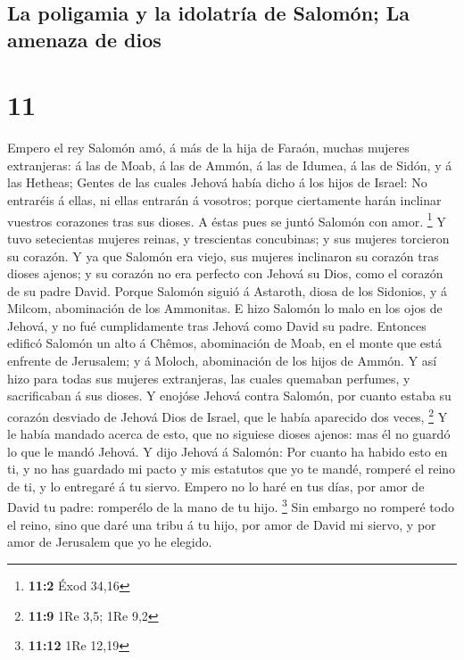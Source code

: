\hypertarget{la-poligamia-y-la-idolatruxeda-de-salomuxf3n-la-amenaza-de-dios}{%
\subsection{La poligamia y la idolatría de Salomón; La amenaza de
dios}\label{la-poligamia-y-la-idolatruxeda-de-salomuxf3n-la-amenaza-de-dios}}

\hypertarget{section-10}{%
\section{11}\label{section-10}}

 Empero el rey Salomón amó, á más de la hija de Faraón,
muchas mujeres extranjeras: á las de Moab, á las de Ammón, á las de
Idumea, á las de Sidón, y á las Hetheas;  Gentes de las
cuales Jehová había dicho á los hijos de Israel: No entraréis á ellas,
ni ellas entrarán á vosotros; porque ciertamente harán inclinar vuestros
corazones tras sus dioses. A éstas pues se juntó Salomón con amor.
\footnote{\textbf{11:2} Éxod 34,16}  Y tuvo setecientas
mujeres reinas, y trescientas concubinas; y sus mujeres torcieron su
corazón.  Y ya que Salomón era viejo, sus mujeres
inclinaron su corazón tras dioses ajenos; y su corazón no era perfecto
con Jehová su Dios, como el corazón de su padre David. 
Porque Salomón siguió á Astaroth, diosa de los Sidonios, y á Milcom,
abominación de los Ammonitas.  E hizo Salomón lo malo en
los ojos de Jehová, y no fué cumplidamente tras Jehová como David su
padre.  Entonces edificó Salomón un alto á Chêmos,
abominación de Moab, en el monte que está enfrente de Jerusalem; y á
Moloch, abominación de los hijos de Ammón.  Y así hizo
para todas sus mujeres extranjeras, las cuales quemaban perfumes, y
sacrificaban á sus dioses.  Y enojóse Jehová contra
Salomón, por cuanto estaba su corazón desviado de Jehová Dios de Israel,
que le había aparecido dos veces, \footnote{\textbf{11:9} 1Re 3,5; 1Re
  9,2}  Y le había mandado acerca de esto, que no
siguiese dioses ajenos: mas él no guardó lo que le mandó Jehová.
 Y dijo Jehová á Salomón: Por cuanto ha habido esto en
ti, y no has guardado mi pacto y mis estatutos que yo te mandé, romperé
el reino de ti, y lo entregaré á tu siervo.  Empero no lo
haré en tus días, por amor de David tu padre: romperélo de la mano de tu
hijo. \footnote{\textbf{11:12} 1Re 12,19}  Sin embargo no
romperé todo el reino, sino que daré una tribu á tu hijo, por amor de
David mi siervo, y por amor de Jerusalem que yo he elegido.

